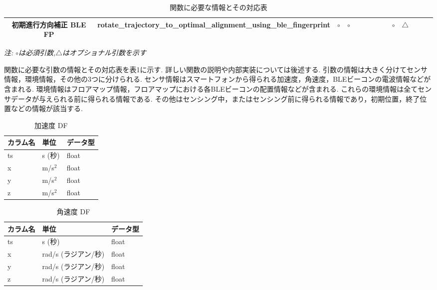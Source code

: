 \begin{table}[ht]
{\begin{tabular}{|c|c|c|c|c|c|c|c|c|c|c|c|c|c|}
			初期進行方向補正 BLE FP & rotate\_trajectory\_to\_optimal\_alignment\_using\_ble\_fingerprint
			                & \multicolumn{1}{c|}{$\circ$}                                        & \multicolumn{1}{c|}{$\circ$} &                              &                              &                              &                              &                                                                                                               & \multicolumn{1}{c|}{$\circ$} & \multicolumn{1}{c|}{$\triangle$} &                                  &    &                                   \\ \hline
		\end{tabular}
	}
	\caption{関数に必要な情報とその対応表} \label{}
	\textit{注: $\circ$は必須引数,$\triangle$はオプショナル引数を示す} \label{tab:my_label}
\end{table}


関数に必要な引数の情報とその対応表を表1に示す.
詳しい関数の説明や内部実装については後述する.
引数の情報は大きく分けてセンサ情報，環境情報，その他の3つに分けられる.
センサ情報はスマートフォンから得られる加速度，角速度，BLEビーコンの電波情報などが含まれる.
環境情報はフロアマップ情報，フロアマップにおける各BLEビーコンの配置情報などが含まれる.
これらの環境情報は全てセンサデータが与えられる前に得られる情報である.
その他はセンシング中，またはセンシング前に得られる情報であり，初期位置，終了位置などの情報が該当する.


\begin{table}[ht]
	\centering
	\begin{tabular}{lll}
		\toprule
		カラム名 & 単位        & データ型  \\
		\midrule
		ts   & s (秒)     & float \\
		x    & m/s\(^2\) & float \\
		y    & m/s\(^2\) & float \\
		z    & m/s\(^2\) & float \\
		\bottomrule
	\end{tabular}
	\caption{加速度 DF}
\end{table}

\begin{table}[ht]
	\centering
	\begin{tabular}{lll}
		\toprule
		カラム名 & 単位             & データ型  \\
		\midrule
		ts   & s (秒)          & float \\
		x    & rad/s (ラジアン/秒) & float \\
		y    & rad/s (ラジアン/秒) & float \\
		z    & rad/s (ラジアン/秒) & float \\
		\bottomrule
	\end{tabular}
	\caption{角速度 DF}
\end{table}


